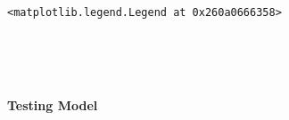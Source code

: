 \documentclass[11pt]{article}
\makeatletter
\newcommand{\boxspacing}{\kern\kvtcb@left@rule\kern\kvtcb@boxsep}
\newcommand{\prompt}[4]{
        \ttfamily\llap{{\color{#2}[#3]:\hspace{3pt}#4}}\vspace{-\baselineskip}
    }
\makeatother
\begin{document}
            \begin{tcolorbox}[breakable, size=fbox, boxrule=.5pt, pad at break*=1mm, opacityfill=0]
\prompt{Out}{outcolor}{6}{\boxspacing}
\begin{Verbatim}[commandchars=\\\{\}]
<matplotlib.legend.Legend at 0x260a0666358>
\end{Verbatim}
\end{tcolorbox}
        
    \begin{center}
    \end{center}
    { \hspace*{\fill} \\}
    
    \begin{center}
    \end{center}
    { \hspace*{\fill} \\}
    
    \hypertarget{testing-model}{%
\paragraph{Testing Model}\label{testing-model}}
\end{document}
